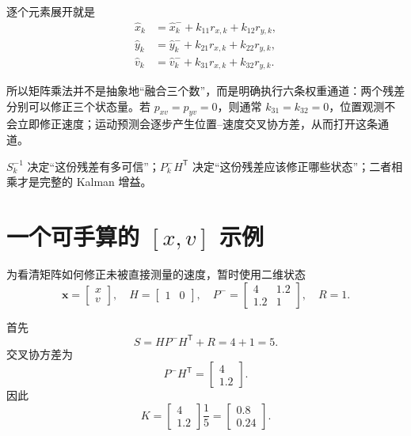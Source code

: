 \documentclass[UTF8,a4paper,11pt]{ctexart}
\newcommand{\prior}{^{-}}
\newcommand{\transpose}{^{\mathsf T}}
\begin{document}
逐个元素展开就是
\begin{align}
\hat x_k&=\hat x_k\prior+k_{11}r_{x,k}+k_{12}r_{y,k},\\
\hat y_k&=\hat y_k\prior+k_{21}r_{x,k}+k_{22}r_{y,k},\\
\hat v_k&=\hat v_k\prior+k_{31}r_{x,k}+k_{32}r_{y,k}.
\end{align}

所以矩阵乘法并不是抽象地“融合三个数”，而是明确执行六条权重通道：两个残差分别可以修正三个状态量。若 $p_{xv}=p_{yv}=0$，则通常 $k_{31}=k_{32}=0$，位置观测不会立即修正速度；运动预测会逐步产生位置--速度交叉协方差，从而打开这条通道。

\begin{keybox}
$S_k^{-1}$ 决定“这份残差有多可信”；$P_k\prior H\transpose$ 决定“这份残差应该修正哪些状态”；二者相乘才是完整的 Kalman 增益。
\end{keybox}

\section{一个可手算的 \texorpdfstring{$[x,v]$}{[x,v]} 示例}

为看清矩阵如何修正未被直接测量的速度，暂时使用二维状态
\begin{equation}
\bm x=\begin{bmatrix}x\\v\end{bmatrix},
\quad
H=\begin{bmatrix}1&0\end{bmatrix},
\quad
P\prior=\begin{bmatrix}4&1.2\\1.2&1\end{bmatrix},
\quad R=1.
\end{equation}

首先
\begin{equation}
S=HP\prior H\transpose+R=4+1=5.
\end{equation}
交叉协方差为
\begin{equation}
P\prior H\transpose=\begin{bmatrix}4\\1.2\end{bmatrix}.
\end{equation}
因此
\begin{equation}
K=\begin{bmatrix}4\\1.2\end{bmatrix}\frac{1}{5}
=\begin{bmatrix}0.8\\0.24\end{bmatrix}.
\end{equation}
\end{document}
